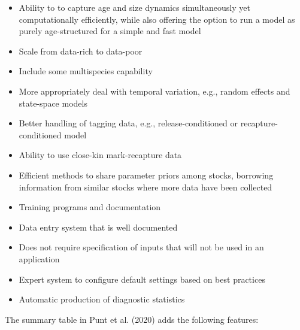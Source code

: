 \documentclass{SCreport}
\begin{document}
\begin{itemize}
  \item Ability to to capture age and size dynamics simultaneously yet
  computationally efficiently, while also offering the option to run a model as
  purely age-structured for a simple and fast model
  \item Scale from data-rich to data-poor
  \item Include some multispecies capability
  \item More appropriately deal with temporal variation, e.g., random effects
  and state-space models
  \item Better handling of tagging data, e.g., release-conditioned or
  recapture-conditioned model
  \item Ability to use close-kin mark-recapture data
  \item Efficient methods to share parameter priors among stocks, borrowing
  information from similar stocks where more data have been collected
  \item Training programs and documentation
  \item Data entry system that is well documented
  \item Does not require specification of inputs that will not be used in an
  application
  \item Expert system to configure default settings based on best practices
  \item Automatic production of diagnostic statistics
\end{itemize}

\newpage

The summary table in Punt et al. (2020) adds the following features:
\end{document}
